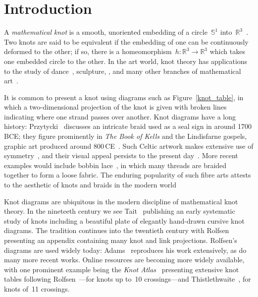 \documentclass{birkjour}
\theoremstyle{definition}
\theoremstyle{remark}
\numberwithin{equation}{section}
\begin{document}
\section{Introduction}

A {\em mathematical knot} is a smooth, unoriented embedding of a
circle~$\mathbb{S}^1$ into~$\mathbb{R}^3$~\cite{manturov2004,adams2004}.  Two
knots are said to be equivalent if the embedding of one can be
continuously deformed to the other; if so, there is a
homeomorphism~$h\colon\mathbb{R}^3\longrightarrow\mathbb{R}^3$ which
takes one embedded circle to the other.  In the art world, knot theory
has applications to the study of dance~\cite{khorami2020}, sculpture,
\cite{bosch2010, widmark2020}, and many other branches of mathematical
art~\cite{hart2008}.

It is common to present a knot using diagrams such as
Figure~\ref{knot_table}, in which a two-dimensional projection of the
knot is given with broken lines indicating where one strand passes
over another.  Knot diagrams have a long history:
Przytycki~\cite{przytycki1998} discusses an intricate braid used as a
seal sign in around 1700\,BCE; they figure prominently in {\em The
  Book of Kells} and the Lindisfarne gospels, graphic art produced
around 800\,CE~\cite{bain1973}.  Such Celtic artwork makes extensive
use of symmetry~\cite{cromwell2008}, and their visual appeal persists
to the present day~\cite{antonsen2021}.  More recent examples would
include bobbin lace~\cite{irvine2020}, in which many threads are
braided together to form a loose fabric.  The enduring popularity of
such fibre arts attests to the aesthetic of knots and braids in the
modern world

Knot diagrams are ubiquitous in the modern discipline of mathematical
knot theory.  In the nineteeth century we see Tait~\cite{tait1884}
publishing an early systematic study of knots including a beautiful
plate of elegantly hand-drawn cursive knot diagrams.  The tradition
continues into the twentieth century with Rolfsen~\cite{rolfsen1976}
presenting an appendix containing many knot and link projections.
Rolfsen's diagrams are used widely today: Adams~\cite{adams2004}
reproduces his work extensively, as do many more recent works.  Online
resources are becoming more widely available, with one prominent
example being the {\em Knot Atlas}~\cite{knot_atlas} presenting
extensive knot tables following Rolfsen~\cite{rolfsen1976}---for knots
up to~10 crossings---and Thistlethwaite~\cite{hoste1998}, for knots
of~11 crossings.
\end{document}
